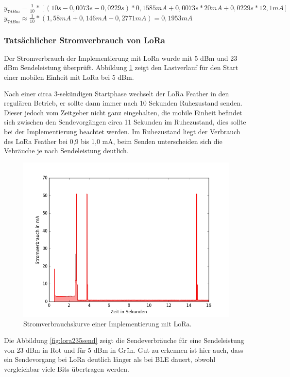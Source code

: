 $y_{7dBm} = \frac{1}{10} * [(10s - 0,0073s - 0,0229s) * 0,1585mA + 0,0073s * 20mA + 0,0229s * 12,1mA]$\\[0.5cm]
$y_{7dBm} \approx \frac{1}{10} * (1,58mA + 0,146mA + 0,2771mA) = 0,1953mA$

\subsubsection{Tatsächlicher Stromverbrauch von LoRa}
\label{ch:phase3:sec:powerlora}
Der Stromverbrauch der Implementierung mit LoRa wurde mit 5 dBm und 23 dBm Sendeleistung überprüft.
Abbildung \ref{fig:lora5} zeigt den Lastverlauf für den Start einer mobilen Einheit mit LoRa bei 5 dBm.

Nach einer circa 3-sekündigen Startphase wechselt der LoRa Feather in den regulären Betrieb, er sollte dann immer nach 10 Sekunden Ruhezustand senden.
Dieser jedoch vom Zeitgeber nicht ganz eingehalten, die mobile Einheit befindet sich zwischen den Sendevorgängen circa 11 Sekunden im Ruhezustand, dies sollte bei der Implementierung beachtet werden.
Im Ruhezustand liegt der Verbrauch des LoRa Feather bei 0,9 bis 1,0 mA, beim Senden unterscheiden sich die Vebräuche je nach Sendeleistung deutlich.

\begin{figure}[h!]
  \centering
	\includegraphics[width=\textwidth]{plots/lora5.png}
  \caption{Stromverbrauchskurve einer Implementierung mit LoRa.}
  \label{fig:lora5}
\end{figure}

Die Abbildung \ref{fig:lora235send} zeigt die Sendeverbräuche für eine Sendeleistung von 23 dBm in Rot und für 5 dBm in Grün.
Gut zu erkennen ist hier auch, dass ein Sendevorgang bei LoRa deutlich länger als bei BLE dauert, obwohl vergleichbar viele Bits übertragen werden.

